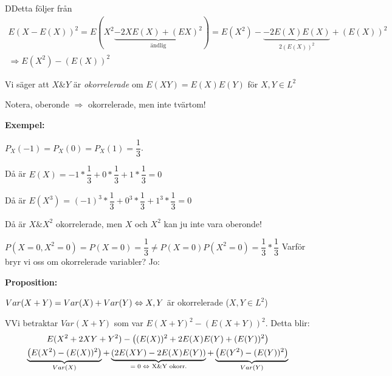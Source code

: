 \begin{prf}
  DDetta följer från
  \begin{equation*}
    \begin{gathered}
      E(X-E(X))^2= E(X^2\underbrace{-2XE(X)+(EX)^2}_{\text{ändlig}}) = E(X^2)-\underbrace{-2E(X)E(X)}_{\text{$2(E(X))^2$}}+(E(X))^2\\
      \Rightarrow E(X^2)-(E(X))^2
    \end{gathered}
  \end{equation*}
\end{prf}
\par\bigskip
\noindent Vi säger att $X\&Y$ är \textit{okorrelerade} om $E(XY)=E(X)E(Y)$ för $X,Y\in L^2$\par
\noindent Notera, oberonde $\Rightarrow$ okorrelerade, men inte tvärtom!
\par\bigskip
\noindent\textbf{Exempel:}\par
\noindent $P_X(-1) = P_X(0)=P_X(1) = \dfrac{1}{3}$.\par
Då är $E(X) = -1*\dfrac{1}{3}+0*\dfrac{1}{3}+1*\dfrac{1}{3} = 0$\par
Då är $E(X^3)$ = $(-1)^3*\dfrac{1}{3}+0^3*\dfrac{1}{3}+1^3*\dfrac{1}{3} = 0$
\par\bigskip
\noindent Då är $X\& X^2$ okorrelerade, men $X$ och $X^2$ kan ju inte vara oberonde!\par
\noindent $P(X=0,X^2=0) = P(X=0) = \dfrac{1}{3}\neq P(X=0)P(X^2=0)=\dfrac{1}{3}*\dfrac{1}{3}$
\newpage
\noindent Varför bryr vi oss om okorrelerade variabler? Jo:
\par\bigskip
\noindent\textbf{Proposition:}\par
\noindent $Var(X+Y) = Var(X)+Var(Y)\Leftrightarrow X,Y$ är okorrelerade ($X,Y\in L^2$)
\par\bigskip
\begin{prf}
  VVi betraktar $Var(X+Y)$ som var $E(X+Y)^2-\left(E(X+Y)\right)^2$. Detta blir:
  \begin{equation*}
    \begin{gathered}
      E(X^2+2XY+Y^2)-\left((E(X))^2+2E(X)E(Y)+(E(Y))^2\right)\\
      \underbrace{\left(E(X^2)-(E(X))^2\right)}_{\text{$Var(X)$}} + \underbrace{\left(2E(XY)-2E(X)E(Y)\right)}_{\text{$=0\Leftrightarrow$ X\&Y okorr.}}+\underbrace{\left(E(Y^2)-(E(Y))^2\right)}_{\text{$Var(Y)$}}
    \end{gathered}
  \end{equation*}
\end{prf}
\par\bigskip
